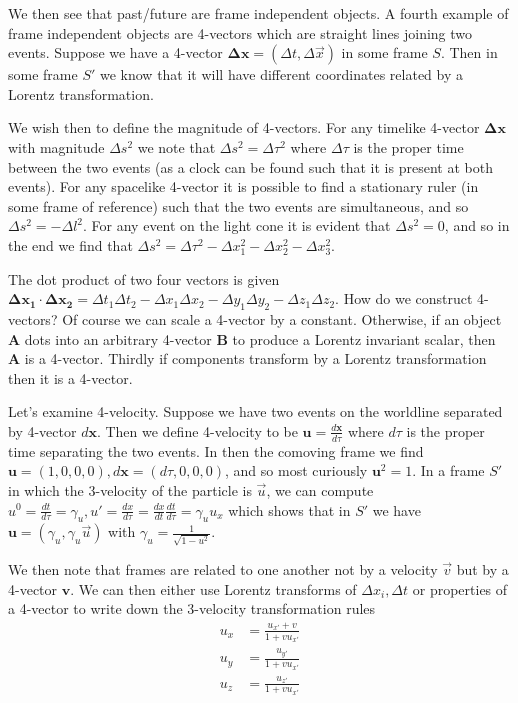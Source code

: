 \documentclass[10pt]{report}
\newcommand{\rd}[2]{\frac{d#1}{d#2}}
\begin{document}
We then see that past/future are frame independent objects. A fourth example of frame independent objects are 4-vectors which are straight lines joining two events. Suppose we have a 4-vector $\mathbf{\Delta x}= (\Delta t, \Delta \vec{x})$ in some frame $S$. Then in some frame $S'$ we know that it will have different coordinates related by a Lorentz transformation.

We wish then to define the magnitude of 4-vectors. For any timelike 4-vector $\mathbf{\Delta x}$ with magnitude $\Delta s^2$ we note that $\Delta s^2 = \Delta \tau^2$ where $\Delta \tau$ is the proper time between the two events (as a clock can be found such that it is present at both events). For any spacelike 4-vector it is possible to find a stationary ruler (in some frame of reference) such that the two events are simultaneous, and so $\Delta s^2 = - \Delta l^2$. For any event on the light cone it is evident that $\Delta s^2 = 0$, and so in the end we find that $\Delta s^2 = \Delta \tau^2 - \Delta x_1^2 - \Delta x_2^2 - \Delta x_3^2$. 

The dot product of two four vectors is given $\mathbf{\Delta x_1} \cdot \mathbf{\Delta x_2} = \Delta t_1\Delta t_2 - \Delta x_1 \Delta x_2 - \Delta y_1 \Delta y_2 - \Delta z_1\Delta z_2$. How do we construct 4-vectors? Of course we can scale a 4-vector by a constant. Otherwise, if an object $\mathbf{A}$ dots into an arbitrary 4-vector $\mathbf{B}$ to produce a Lorentz invariant scalar, then $\mathbf{A}$ is a 4-vector. Thirdly if components transform by a Lorentz transformation then it is a 4-vector.

Let's examine 4-velocity. Suppose we have two events on the worldline separated by 4-vector $d\mathbf{x}$. Then we define 4-velocity to be $\mathbf{u} = \rd{\mathbf{x}}{\tau}$ where $d\tau$ is the proper time separating the two events. In then the comoving frame we find $\mathbf{u} = (1,0,0,0), d\mathbf{x} = (d\tau, 0,0,0)$, and so most curiously $\mathbf{u}^2 = 1$. In a frame $S'$ in which the 3-velocity of the particle is $\vec{u}$, we can compute $u^0 = \rd{t}{\tau} = \gamma_u, u' = \rd{x}{\tau} = \rd{x}{t}\rd{t}{\tau} = \gamma_u u_x$ which shows that in $S'$ we have $\mathbf{u} = (\gamma_u, \gamma_u \vec{u})$ with $\gamma_u = \frac{1}{\sqrt{1-u^2}}$. 

We then note that frames are related to one another not by a velocity $\vec{v}$ but by a 4-vector $\mathbf{v}$. We can then either use Lorentz transforms of $\Delta x_i, \Delta t$ or properties of a 4-vector to write down the 3-velocity transformation rules
\begin{align*}
    u_x &= \frac{u_{x'} + v}{1+vu_{x'}}\\
    u_y &= \frac{u_{y'}}{1+vu_{x'}}\\
    u_z &= \frac{u_{z'}}{1+vu_{x'}}
\end{align*}
\end{document}
